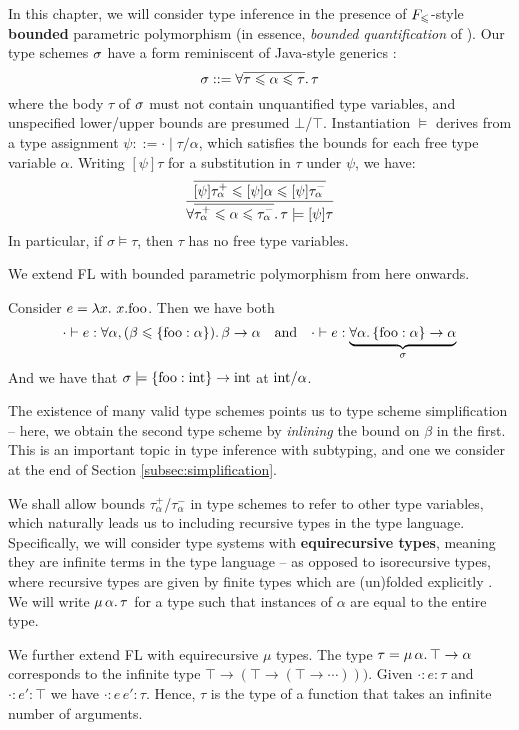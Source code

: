 In this chapter, we will consider type inference in the presence of $F_\leqslant$-style \textbf{bounded} parametric polymorphism (in essence, \emph{bounded quantification} of \textcite{bounded-quantification}). Our type schemes $\sigma$ have a form reminiscent of Java-style generics \cite{generic-java, simple-sub}:
$$ \sigma ::= \forall \overline{\tau \leqslant \alpha \leqslant \tau} \ldotp \tau $$
where the body $\tau$ of $\sigma$ must not contain unquantified type variables, and unspecified lower/upper bounds are presumed $\bot$/$\top$. 
Instantiation $\models$ derives from a type assignment $\psi ::= \cdot \mid \tau/\alpha$, which satisfies the bounds for each free type variable $\alpha$. Writing $[\psi]\tau$ for a substitution in $\tau$ under $\psi$, we have:
$$ \dfrac{\overline{[\psi]\tau_\alpha^+ \sub \substx{\psi} \alpha \sub [\psi]\tau_\alpha^-}}{\forall \overline{\tau_\alpha^+ \sub \alpha \sub \tau_\alpha^-} \ldotp \tau \models \substx{\psi}{\tau}} $$
In particular, if $\sigma \models \tau$, then $\tau$ has no free type variables.

\begin{example}
    We extend FL with bounded parametric polymorphism from here onwards. 

    Consider $e = \lambda {x} \ldotp\, {x}{.}{\mathrm{foo}}$. Then we have both 
    $$ \cdot \vdash e : \forall \alpha, (\beta \sub \flrec{\mathrm{foo} : \alpha}) \ldotp \beta \to \alpha  \quad \text{and} \quad \cdot \vdash e : \underbrace{\forall  \alpha \ldotp \flrec{\mathrm{foo} : \alpha} \to \alpha}_\sigma $$
    And we have that $\sigma \models \flrec{\mathrm{foo} : \sint} \to \sint$ at $\mathrm{int}/\alpha$.
    
    The existence of many valid type schemes points us to type scheme simplification -- here, we obtain the second type scheme by \emph{inlining} the bound on $\beta$ in the first. This is an important topic in type inference with subtyping, and one we consider at the end of Section \ref{subsec:simplification}.
\end{example}

We shall allow bounds $\tau_\alpha^+$/$\tau_\alpha^-$ in type schemes to refer to other type variables, which naturally leads us to including recursive types in the type language.
Specifically, we will consider type systems with \textbf{equirecursive types}, meaning they are infinite terms in the type language -- as opposed to isorecursive types, where recursive types are given by finite types which are (un)folded explicitly \cite{tapl}. We will write $\mu\,{\alpha}\ldotp \tau$ for a type  such that instances of $\alpha$ are equal to the entire type.
\begin{example}
    We further extend FL with equirecursive $\mu$ types. 
    The type $\tau = \mu\,{\alpha}\ldotp \top \to \alpha$ corresponds to the infinite type $\top \to (\top \to (\top \to \cdots)))$. Given $\cdot : e : \tau$ and $\cdot : e' : \top$ we have $\cdot : e\,e' : \tau$. Hence, $\tau$ is the type of a function that takes an infinite number of arguments.
\end{example}

